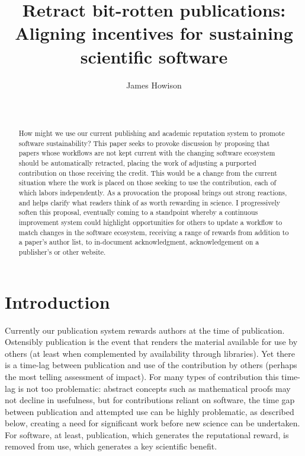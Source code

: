 \documentclass{sigchi}
\begin{document}
\title{Retract bit-rotten publications: Aligning incentives for sustaining scientific software}

\author{
  \alignauthor James Howison\\
    \\
    \\
}

\maketitle

\begin{abstract}
How might we use our current publishing and academic reputation system to promote software sustainability? This paper seeks to provoke discussion by proposing that papers whose workflows are not kept current with the changing software ecosystem should be automatically retracted, placing the work of adjusting a purported contribution on those receiving the credit. This would be a change from the current situation where the work is placed on those seeking to use the contribution, each of which labors independently. As a provocation the proposal brings out strong reactions, and helps clarify what readers think of as worth rewarding in science. I progressively soften this proposal, eventually coming to a standpoint whereby a continuous improvement system could highlight opportunities for others to update a workflow to match changes in the software ecosystem, receiving a range of rewards from addition to a paper's author list, to in-document acknowledgment, acknowledgement on a publisher's or other website.
\end{abstract}

%




\section{Introduction}

Currently our publication system rewards authors at the time of publication. Ostensibly publication is the event that renders the material available for use by others (at least when complemented by availability through libraries). Yet there is a time-lag between publication and use of the contribution by others (perhaps the most telling assessment of impact). For many types of contribution this time-lag is not too problematic: abstract concepts such as mathematical proofs may not decline in usefulness, but for contributions reliant on software, the time gap between publication and attempted use can be highly problematic, as described below, creating a need for significant work before new science can be undertaken. For software, at least, publication, which generates the reputational reward, is removed from use, which generates a key scientific benefit.
\end{document}
